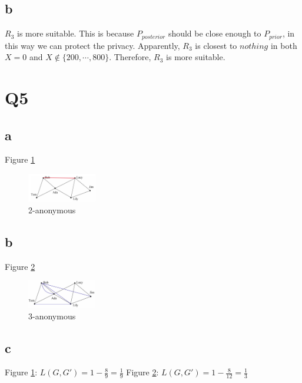 \documentclass[12pt]{article}
\begin{document}
\subsection{b}
$R_3$ is more suitable. This is because $P_{posterior}$ should be close enough to $P_{prior}$, in this way we can protect the privacy.
Apparently, $R_3$ is closest to $nothing$ in both $X=0$ and $X\notin \{200, \cdots ,800\}$. Therefore, $R_3$ is more suitable.

\section{Q5}
\subsection{a}
Figure \ref{fig:3}
\begin{figure}[htbp]
    \centering
    \includegraphics[width = 0.27\textwidth]{pics/pic3.png}
    \caption{2-anonymous}
    \label{fig:3}
\end{figure}
\subsection{b}
Figure \ref{fig:4}
\begin{figure}[htbp]
    \centering
    \includegraphics[width = 0.27\textwidth]{pics/pic4.PNG}
    \caption{3-anonymous}
    \label{fig:4}
\end{figure}
\subsection{c}
Figure \ref{fig:3}:
\newline
$L(G,G')=1-\frac{8}{9}=\frac{1}{9}$
\newline
Figure \ref{fig:4}:
\newline
$L(G,G')=1-\frac{8}{12}=\frac{1}{3}$
\end{document}

